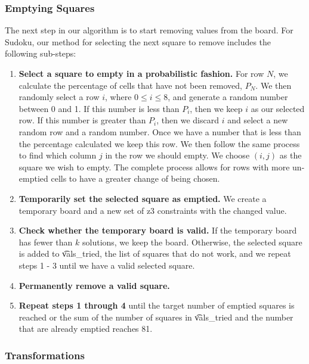 \subsubsection*{Emptying Squares}

The next step in our algorithm is to start removing values from the
board. For Sudoku, our method for
selecting the next square to remove includes the following
sub-steps:

\begin{enumerate}
\item {\bf Select a square to empty in a probabilistic fashion.} For row $N$, we calculate the percentage of cells that have not been removed, $P_N$. We then randomly select a row $i$, where $0 \le i \le 8$, and generate a random number between 0 and 1. If this number is less than $P_i$, then we keep $i$ as our selected row. If this number is greater than $P_i$, then we discard $i$ and select a new random row and a random number. Once we have a number that is less than the percentage calculated we keep this row. We then follow the same process to find which column $j$ in the row we should empty. We choose $(i, j)$ as the square we wish to empty. The complete process allows for rows with more un-emptied cells to have a greater change of being chosen.
\item {\bf Temporarily set the selected square as emptied.} We create a temporary board and a new set of z3 constraints with the changed value.
\item{\bf Check whether the temporary board is valid.} If the temporary board has fewer than $k$ solutions, we keep the board. Otherwise, the selected square is added to \t{vals\_tried}, the list of squares that do not work, and we repeat steps 1 - 3 until we have a valid selected square.
\item{\bf Permanently remove a valid square.}
\item{\bf Repeat steps 1 through 4} until the target number of emptied squares is reached or the sum of the number of squares in \t{vals\_tried} and the number that are already emptied reaches 81. 
\end{enumerate}

\subsubsection*{Transformations}


